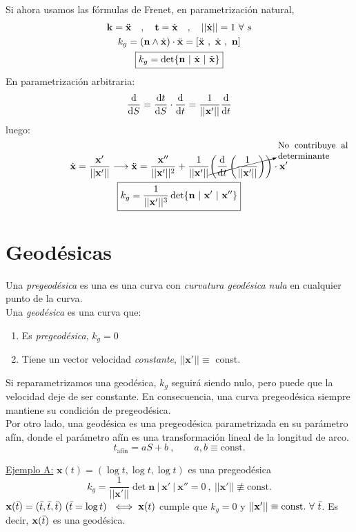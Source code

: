 Si ahora usamos las fórmulas de Frenet, en parametrización natural,
\begin{gather*}
    \mathbf{k}=\Ddot{\mathbf{x}} \quad , \quad \mathbf{t}=\dot{\mathbf{x}} \quad , \quad ||\dot{\mathbf{x}}||=1 \ \forall \ s\\
    k_g=(\mathbf{n}\wedge \dot{\mathbf{x}})\cdot \ddot{\mathbf{x}}=[\ddot{\mathbf{x}}\ ,\ \dot{\mathbf{x}}\ ,\ \mathbf{n}]\\
    \boxed{k_g=\det{\mathbf{n}\ | \ \dot{\mathbf{x}}\  | \ \ddot{\mathbf{x}}}}
\end{gather*}
En parametrización arbitraria:
$$
\dv{}{S}=\dv{t}{S}\cdot \dv{}{t}=\frac{1}{||\mathbf{x}'||}\dv{}{t}
$$
luego:
\begin{gather*}
    \dot{\mathbf{x}}=\frac{\mathbf{x}'}{||\mathbf{x}'||}\longrightarrow \ddot{\mathbf{x}}=\frac{\mathbf{x}''}{||\mathbf{x}'||^2}+\frac{1}{||\mathbf{x}'||}\cancelto{\text{\parbox{2.55cm}{\small No contribuye al determinante}}}{\left ( \dv{}{t} \left ( \frac{1}{||\mathbf{x}'||} \right ) \right )}\cdot \mathbf{x}'\\
    \boxed{k_g=\frac{1}{||\mathbf{x}'||^3}\det{\mathbf{n} \ | \ \mathbf{x}' \ | \ \mathbf{x}''}}
\end{gather*}
\section{Geodésicas}
Una \emph{pregeodésica} es una es una curva con \emph{curvatura geodésica nula} en cualquier punto de la curva.\\

Una \emph{geodésica} es una curva que:
\begin{enumerate}
    \item Es \emph{pregeodésica}, $k_g=0$
    \item Tiene un vector velocidad \emph{constante}, $||\mathbf{x}'||\equiv $ const.
\end{enumerate}

Si reparametrizamos una geodésica, $k_g$ seguirá siendo nulo, pero puede que la velocidad deje de ser constante. En consecuencia, una curva pregeodésica siempre mantiene su condición de pregeodésica.\\

Por otro lado, una geodésica es una pregeodésica parametrizada en su parámetro afín, donde el parámetro afín es una transformación lineal de la longitud de arco.
$$
t_\text{afín}=aS+b\ , \qquad a,b\equiv \text{const.} 
$$
\begin{mybox}
    \underline{Ejemplo A:} $\mathbf{x}(t)=(\log t,\log t,\log t)$ es una pregeodésica
    $$
    k_g=\frac{1}{||\mathbf{x}'||}\det{\mathbf{n} \ | \ \mathbf{x}' \ | \ \mathbf{x}''}=0 \ , \ ||\mathbf{x}'||\not \equiv \text{const.}
    $$
    $
    \mathbf{x}(\Bar{t})=(\Bar{t},\Bar{t},\Bar{t}) \ (\Bar{t}=\log t)\ \iff \mathbf{x}(t)
    $ cumple que $k_g=0$ y  $||\mathbf{x}'||\equiv \text{const.}  \ \forall \ \Bar{t}$. Es decir, $\mathbf{x}(\Bar{t})$ es una geodésica.
\end{mybox}

